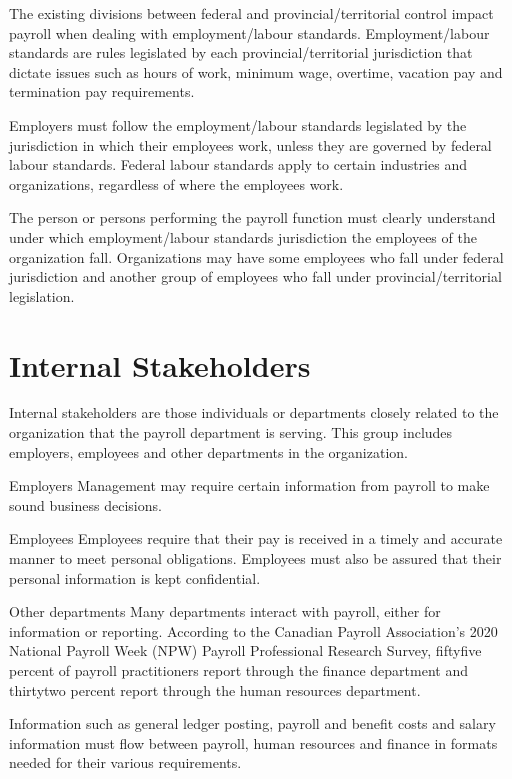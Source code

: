 \documentclass[letterpaper,10pt,english]{sphinxmanual}
\begin{document}
\sphinxAtStartPar
The existing divisions between federal and provincial/territorial control impact payroll when
dealing with employment/labour standards. Employment/labour standards are rules legislated
by each provincial/territorial jurisdiction that dictate issues such as hours of work, minimum
wage, overtime, vacation pay and termination pay requirements.

\sphinxAtStartPar
Employers must follow the employment/labour standards legislated by the jurisdiction in
which their employees work, unless they are governed by federal labour standards. Federal
labour standards apply to certain industries and organizations, regardless of where the
employees work.

\sphinxAtStartPar
The person or persons performing the payroll function must clearly understand under which
employment/labour standards jurisdiction the employees of the organization fall.
Organizations may have some employees who fall under federal jurisdiction and another
group of employees who fall under provincial/territorial legislation.


\section{Internal Stakeholders}
\label{\detokenize{1_introduction:internal-stakeholders}}
\sphinxAtStartPar
Internal stakeholders are those individuals or departments closely related to the organization
that the payroll department is serving. This group includes employers, employees and other
departments in the organization.

\sphinxAtStartPar
Employers \sphinxhyphen{} Management may require certain information from payroll to make sound
business decisions.

\sphinxAtStartPar
Employees \sphinxhyphen{} Employees require that their pay is received in a timely and accurate manner to
meet personal obligations. Employees must also be assured that their personal information is
kept confidential.

\sphinxAtStartPar
Other departments \sphinxhyphen{} Many departments interact with payroll, either for information or
reporting. According to the Canadian Payroll Association’s 2020 National Payroll Week
(NPW) Payroll Professional Research Survey, fifty\sphinxhyphen{}five percent of payroll practitioners
report through the finance department and thirty\sphinxhyphen{}two percent report through the human
resources department.

\sphinxAtStartPar
Information such as general ledger posting, payroll and benefit costs
and salary information must flow between payroll, human resources and finance in formats
needed for their various requirements.
\end{document}
